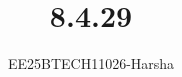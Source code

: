 \documentclass[journal]{IEEEtran}
\begin{document}

\vspace{3cm}

\title{8.4.29}
\author{EE25BTECH11026-Harsha}
 \maketitle
{\let\newpage\relax\maketitle}

\renewcommand{\thefigure}{\theenumi}
\renewcommand{\thetable}{\theenumi}
\setlength{\intextsep}{10pt} %


\renewcommand{\thetable}{\theenumi}
\end{document}
